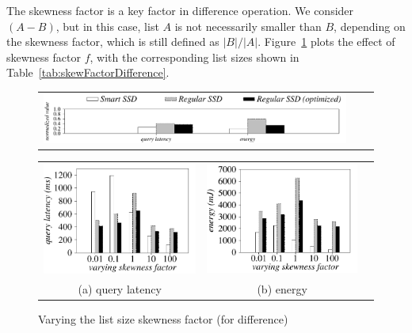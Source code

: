 The skewness factor is a key factor in \textsf{difference} operation.
We consider $(A-B)$, but in this case, list $A$ is not necessarily smaller than $B$, depending on the skewness factor, which is still defined as $|B|/|A|$.
Figure~\ref{fig:varyListSkewDifference} plots the effect of skewness factor $f$, with the corresponding list sizes shown in Table~\ref{tab:skewFactorDifference}.


\begin{figure}[H]
  \centering
    \begin{tabular}{ccc}
 \includegraphics[width=0.95\columnwidth]{figures/banner.pdf}%
\end{tabular}
\renewcommand{\tabcolsep}{0.1mm}


  \begin{tabular}{ccc}
 \includegraphics[width=0.5\columnwidth]{figures/Difference-time-VaryListSkew-eps-converted-to.pdf}&
  \includegraphics[width=0.5\columnwidth]{figures/Difference-energy-VaryListSkew-eps-converted-to.pdf}\\
  (a) query latency & (b) energy
\end{tabular}

  \caption{Varying the list size skewness factor (for difference)}
  \label{fig:varyListSkewDifference}
 \end{figure}



